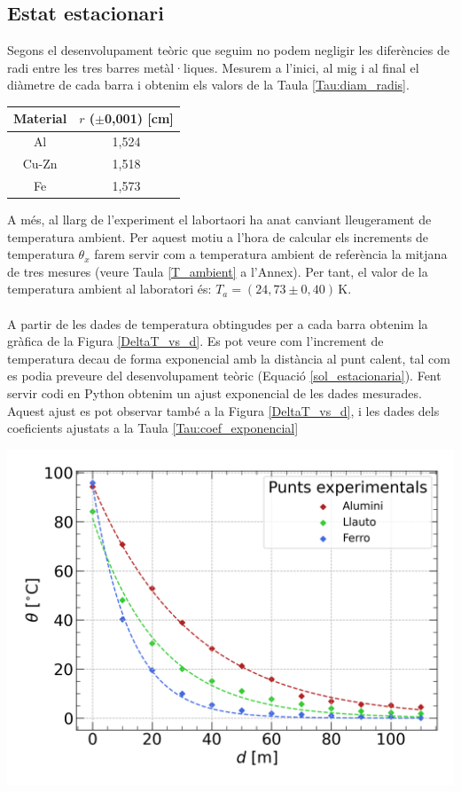 \documentclass[12pt,twosides,onecolumn,openany]{article}
\newenvironment{Figura}
  {\par\medskip\noindent\minipage{\linewidth}}
  {\endminipage\par\medskip}
\begin{document}
\begin{multicols}{2}
\subsection{Estat estacionari}
Segons el desenvolupament teòric que seguim no podem negligir les diferències de radi entre les tres barres metàl·liques. Mesurem a l'inici, al mig i al final el diàmetre de cada barra i obtenim els valors de la Taula \ref{Tau:diam_radis}.
\begin{Figura}
  \centering
  \begin{tabular}{c|c}
    Material & $r$ ($\pm$0,001) [cm] \\
    \hline\hline
    Al & 1,524\\
    Cu-Zn & 1,518\\
    Fe & 1,573 
  \end{tabular}
  \label{Tau:diam_radis}
\end{Figura}
A més, al llarg de l'experiment el labortaori ha anat canviant lleugerament de temperatura ambient. Per aquest motiu a l'hora de calcular els increments de temperatura $\theta_x$ farem servir com a temperatura ambient de referència la mitjana de tres mesures (veure Taula \ref{T_ambient} a l'Annex). Per tant, el valor de la temperatura ambient al laboratori és: \(T_a = (24,73 \pm 0,40)\,\text{K}\).\\\\
A partir de les dades de temperatura obtingudes per a cada barra obtenim la gràfica de la Figura \ref{DeltaT_vs_d}. Es pot veure com l'increment de temperatura decau de forma exponencial amb la distància al punt calent, tal com es podia preveure del desenvolupament teòric (Equació \eqref{sol_estacionaria}). Fent servir codi en Python obtenim un ajust exponencial de les dades mesurades. Aquest ajust es pot observar també a la Figura \ref{DeltaT_vs_d}, i les dades dels coeficients ajustats a la Taula \ref{Tau:coef_exponencial}
\begin{Figura}
  \centering
  \includegraphics[width = 1\linewidth]{../../graphs/practica_Ia/plots/theta_vs_d_estacionaria.png}\label{DeltaT_vs_d}
\end{Figura}


\end{multicols}
\end{document}
